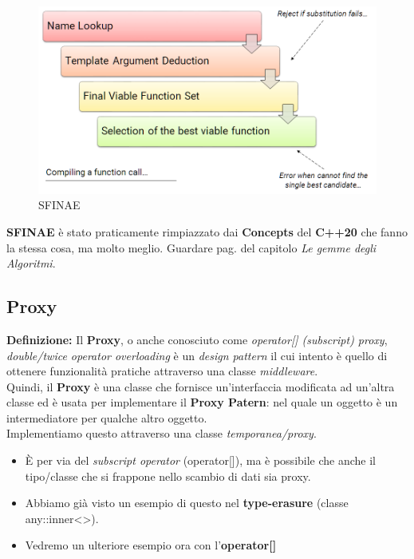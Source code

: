 \begin{figure}[H]
	\centering
	\includegraphics[width=1\textwidth, height=1\textheight, keepaspectratio]{./imgs/SFINAE.png}
	\caption{SFINAE}
	\label{fig:SFINAE}
\end{figure}

\textsf{\small \textbf{SFINAE} è stato praticamente rimpiazzato dai \textbf{Concepts} del \textbf{C++20} che fanno la stessa cosa, ma molto meglio. Guardare pag.\textbf{\pageref{concepts}} del capitolo \emph{Le gemme degli Algoritmi}.} \\ %

\subsection{Proxy}

\textsf{\small \textbf{Definizione: } Il \textbf{Proxy}, o anche conosciuto come \emph{operator[] (subscript) proxy}, \emph{double/twice operator overloading} è un \emph{design pattern} il cui intento è quello di ottenere funzionalità pratiche attraverso una classe \emph{middleware}.} \\

\textsf{\small Quindi, il \textbf{Proxy} è una classe che fornisce un'interfaccia modificata ad un'altra classe ed è usata per implementare il \textbf{Proxy Patern}: nel quale un oggetto è un intermediatore per qualche altro oggetto.} \\

\textsf{\small Implementiamo questo attraverso una classe \emph{temporanea/proxy}.} \break

\begin{itemize}
	\item \textsf{\small È per via del \emph{subscript operator} (operator[]), ma è possibile che anche il tipo/classe che si frappone nello scambio di dati sia proxy. }
	\item \textsf{\small Abbiamo già visto un esempio di questo nel \textbf{type-erasure} (classe any::inner<>).}
	\item \textsf{\small Vedremo un ulteriore esempio ora con l'\textbf{operator[]}}
\end{itemize}


